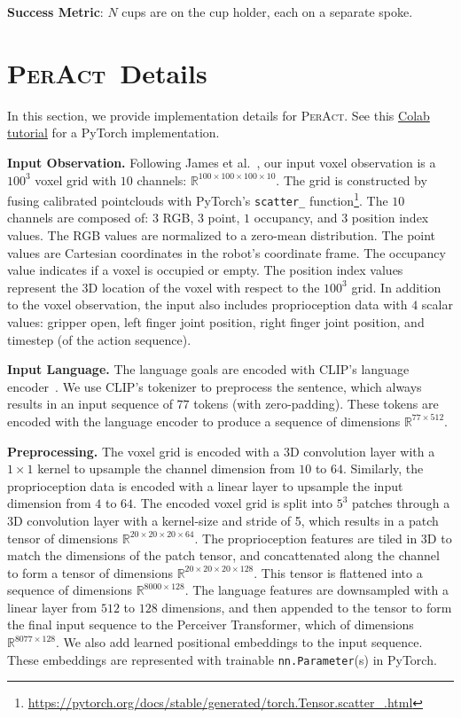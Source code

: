 \documentclass{article}
\newcommand{\model}{\textsc{PerAct}}
\begin{document}
\textbf{Success Metric}: $N$ cups are on the cup holder, each on a separate spoke. 


\section{\model~Details} \label{app:peract_details}
In this section, we provide implementation details for \model. See this \href{https://colab.research.google.com/drive/1wpaosDS94S0rmtGmdnP0J1TjS7mEM14V?usp=sharing}{Colab tutorial} for a PyTorch implementation.

\textbf{Input Observation.} Following James et al.~\citep{c2farm}, our input voxel observation is a $100^3$ voxel grid with $10$ channels:  $\mathbb{R}^{100 \times 100 \times 100 \times 10}$. The grid is constructed by fusing calibrated pointclouds with PyTorch's \texttt{scatter\_}  function\footnote{\url{https://pytorch.org/docs/stable/generated/torch.Tensor.scatter_.html}}. The $10$ channels are composed of: $3$ RGB, $3$ point, $1$ occupancy, and $3$ position index values. The RGB values are normalized to a zero-mean distribution. The point values are Cartesian coordinates in the robot's coordinate frame. The occupancy value indicates if a voxel is occupied or empty. The  position index values represent the 3D location of the voxel with respect to the $100^3$ grid. In addition to the voxel observation, the input also includes proprioception data with $4$ scalar values: gripper open, left finger joint position, right finger joint position, and timestep (of the action sequence). 

\textbf{Input Language.} The language goals are encoded with CLIP's language encoder~\citep{radfordLearningTransferableVisual2021}. We use CLIP's tokenizer to preprocess the sentence, which always results in an input sequence of $77$ tokens (with zero-padding). These tokens are encoded with the language encoder to produce a sequence of dimensions $\mathbb{R}^{77 \times 512}$. 

\textbf{Preprocessing.} The voxel grid is encoded with a 3D convolution layer with a $1\times1$ kernel to upsample the channel dimension from $10$ to $64$. Similarly, the proprioception data is encoded with a linear layer to upsample the input dimension from $4$ to $64$. The encoded voxel grid is split into $5^3$ patches through a 3D convolution layer with a kernel-size and stride of 5, which results in a patch tensor of dimensions $\mathbb{R}^{20 \times 20 \times 20 \times 64}$. The proprioception features are tiled in 3D to match the dimensions of the patch tensor, and concattenated along the channel to form a tensor of dimensions $\mathbb{R}^{20 \times 20 \times 20 \times 128}$. This tensor is flattened into a sequence of dimensions $\mathbb{R}^{8000 \times 128}$. The language features are downsampled with a linear layer from $512$ to $128$ dimensions, and then appended to the tensor to form the final input sequence to the Perceiver Transformer, which of dimensions $\mathbb{R}^{8077 \times 128}$. We also add learned positional embeddings to the input sequence. These embeddings are represented with trainable \texttt{nn.Parameter}(s) in PyTorch.  
\end{document}
